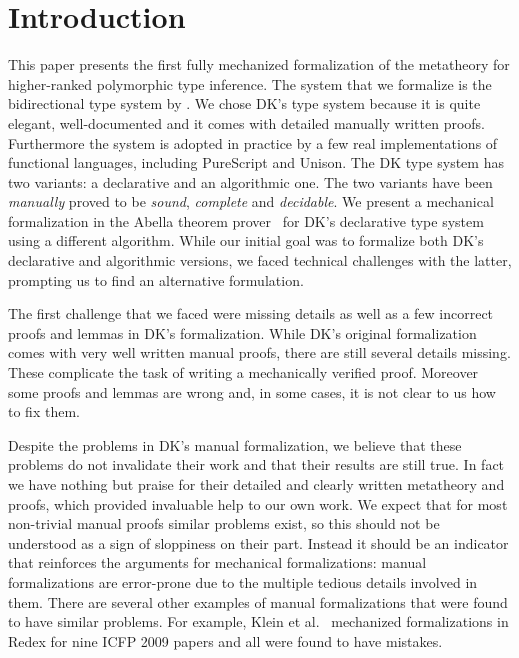 \section{Introduction}



This paper presents the first fully mechanized formalization of the
metatheory for higher-ranked polymorphic type inference.
The system
that we formalize is the bidirectional type system by \citet{dunfield2013complete}.
We chose DK's type system because it is
quite elegant, well-documented and it comes with detailed manually
written proofs. Furthermore the system is adopted in practice by a few
real implementations of functional languages, including PureScript and
Unison. The DK type system has two variants: a declarative
and an algorithmic one. The two variants have been
\emph{manually} proved to be \emph{sound}, \emph{complete} and
\emph{decidable}.
We present a mechanical formalization in the Abella theorem prover~\cite{AbellaDesc} for
DK's declarative type system using a different algorithm. While our
initial goal was to formalize both DK's declarative and algorithmic
versions, we faced technical challenges with the latter, prompting us to find
an alternative formulation.

The first challenge that we faced were missing details as well as
a few incorrect proofs and lemmas in DK's formalization. While DK's
original formalization comes with very well written manual proofs,
there are still several details missing. These complicate the task of
writing a mechanically verified proof. Moreover some proofs and
lemmas are wrong and, in some cases, it is not clear to us how to fix them.


Despite the problems in DK's manual formalization,
we believe that these problems do not
invalidate their work and that their results are still true. In fact we have nothing but praise for their detailed
and clearly written metatheory and proofs, which provided invaluable
help to our own work.
We expect that for most non-trivial manual
proofs similar problems exist, so this should not be understood as a sign of sloppiness
on their part. Instead it should be an indicator that reinforces the arguments
for mechanical formalizations: manual formalizations are error-prone due to the multiple
tedious details involved in them.
There are several other examples of manual formalizations that were found to have
similar problems. For example, Klein et al.~\cite{KleinRunYourResearch}
mechanized formalizations
in Redex for nine ICFP 2009 papers and all were found to have mistakes.

